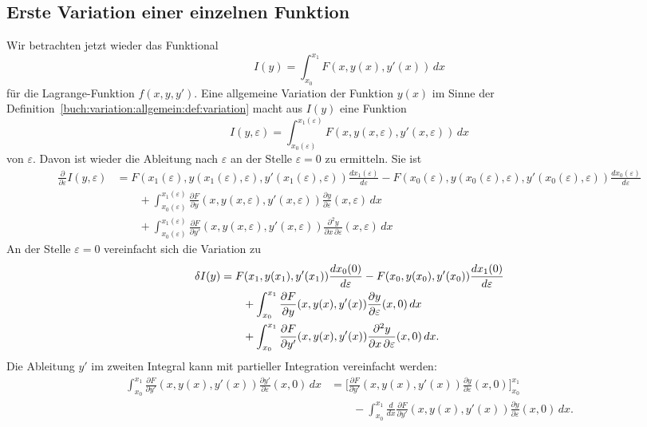 \subsection{Erste Variation einer einzelnen Funktion
\label{buch:variation:allgemein:subsection:var1}}
Wir betrachten jetzt wieder das Funktional
\[
I(y)
=
\int_{x_0}^{x_1} F(x,y(x),y'(x)) \,dx
\]
für die Lagrange-Funktion $f(x,y,y')$.
Eine allgemeine Variation der Funktion $y(x)$ im Sinne der
Definition~\ref{buch:variation:allgemein:def:variation} macht aus
$I(y)$ eine Funktion 
\[
I(y,\varepsilon)
=
\int_{x_0(\varepsilon)}^{x_1(\varepsilon)}
F(x,y(x,\varepsilon),y'(x,\varepsilon))
\,dx
\]
von $\varepsilon$.
Davon ist wieder die Ableitung nach $\varepsilon$ an der Stelle
$\varepsilon=0$ zu ermitteln.
Sie ist
\begin{align*}
\frac{\partial}{\partial\varepsilon}I(y,\varepsilon)
&=
F(x_1(\varepsilon),y(x_1(\varepsilon),\varepsilon),
y'(x_1(\varepsilon),\varepsilon))
\frac{dx_1(\varepsilon)}{d\varepsilon}
-
F(x_0(\varepsilon),y(x_0(\varepsilon),\varepsilon),
y'(x_0(\varepsilon),\varepsilon))
\frac{dx_0(\varepsilon)}{d\varepsilon}
\\
&\qquad
+
\int_{x_0(\varepsilon)}^{x_1(\varepsilon)}
\frac{\partial F}{\partial y}(x, y(x,\varepsilon), y'(x,\varepsilon))
\frac{\partial y}{\partial \varepsilon}(x,\varepsilon)
\,dx
\\
&\qquad
+
\int_{x_0(\varepsilon)}^{x_1(\varepsilon)}
\frac{\partial F}{\partial y'}(x, y(x,\varepsilon), y'(x,\varepsilon))
\frac{\partial^2 y}{\partial x\,\partial\varepsilon}(x,\varepsilon)
\,dx
\end{align*}
An der Stelle $\varepsilon=0$ vereinfacht sich die Variation zu
\begin{align}
\delta I(y)
&=
F(x_1,y(x_1),y'(x_1))
\frac{dx_0(0)}{d\varepsilon}
-
F(x_0,y(x_0),y'(x_0))
\frac{dx_1(0)}{d\varepsilon}
\notag
\\
&\qquad
+
\int_{x_0}^{x_1}
\frac{\partial F}{\partial y}(x,y(x),y'(x))
\frac{\partial y}{\partial \varepsilon}(x,0)
\,dx
\notag
\\
&\qquad
+
\int_{x_0}^{x_1}
\frac{\partial F}{\partial y'}(x,y(x),y'(x))
\frac{\partial^2 y}{\partial x\,\partial\varepsilon}(x,0)
\,dx.
\label{buch:variation:allgemein:eqn:var1}
\end{align}
Die Ableitung $y'$ im zweiten Integral kann mit partieller Integration 
vereinfacht werden:
\begin{align*}
\int_{x_0}^{x_1}
\frac{\partial F}{\partial y'}(x,y(x),y'(x))
\frac{\partial y'}{\partial \varepsilon}(x,0)
\,dx
&=
\biggl[
\frac{\partial F}{\partial y'}(x,y(x),y'(x))
\frac{\partial y}{\partial\varepsilon}(x,0)
\biggr]_{x_0}^{x_1}
\\
&\qquad
-
\int_{x_0}^{x_1}
\frac{d}{dx}
\frac{\partial F}{\partial y'}(x,y(x),y'(x))
\frac{\partial y}{\partial\varepsilon}(x,0)
\,dx.
\end{align*}
